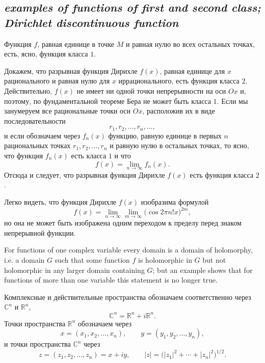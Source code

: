\subsection*{ \textit{examples of functions of first and second class; Dirichlet discontinuous function}}
\begin{rusblock}
Функция $f$, равная единице в точке $M$ и равная нулю во всех остальных точках, есть, ясно, функция класса $1$.

Докажем, что разрывная функция Дирихле $f(x)$, равная единице для $x$ рационального и равная нулю для $x$ иррационального, есть функция класса $2$. Действительно, $f(x)$ не имеет ни одной точки непрерывности на оси $Ox$ и, поэтому, по фундаментальной теореме Бера не может быть класса $1$. Если мы занумеруем все рациональные точки оси $Ox$, расположив их в виде последовательности
\[
r_1,r_2,\ldots,r_n,\ldots,
\]
и если обозначаем через $f_n(x)$ функцию, равную единице в первых $n$ рациональных точках $r_1,r_2,\ldots,r_n$ и равную нулю в остальных точках, то ясно, что функция $f_n(x)$ есть класса $1$ и что
\[
f(x)=\lim_{n\to\infty}f_n(x).
\]
Отсюда и следует, что разрывная функция Дирихле $f(x)$ есть функция класса $2$.

Легко видеть, что функция Дирихле $f(x)$ изобразима формулой
\[
f(x)=\lim_{n\to\infty}\lim_{m\to\infty}\bigl(\cos 2\pi n!x\bigr)^{2m},
\]
но она не может быть изображена одним переходом к пределу перед знаком непрерывной функции.
\end{rusblock}


\begin{sourcebox}
For functions of one complex variable every domain is a domain of holomorphy, i.e. a domain $G$ such that some function $f$ is holomorphic in $G$ but not holomorphic in any larger domain containing $G$; but an example shows that for functions of more than one variable this statement is no longer true.
\end{sourcebox}

\begin{rusblock}
Комплексные и действительные пространства обозначаем соответственно через $\mathbb C^n$ и $\mathbb R^n$,
\[
\mathbb C^n=\mathbb R^n+i\mathbb R^n.
\]
Точки пространства $\mathbb R^n$ обозначаем через
\[
x=(x_1,x_2,\ldots,x_n),\qquad y=(y_1,y_2,\ldots,y_n),
\]
и точки пространства $\mathbb C^n$ через
\[
z=(z_1,z_2,\ldots,z_n)=x+iy,\qquad |z|=\bigl(|z_1|^2+\cdots+|z_n|^2\bigr)^{1/2}.
\]
\end{rusblock}


